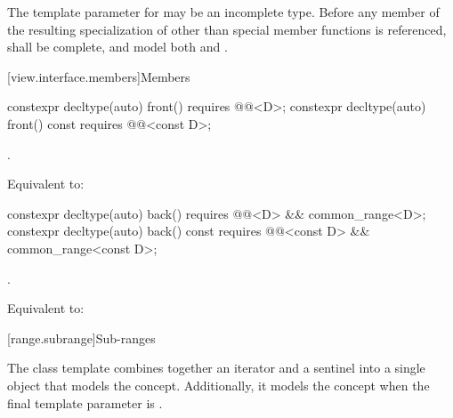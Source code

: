 \pnum
The template parameter  for  may be an
incomplete type. Before any member of the resulting specialization of
 other than special member functions
is referenced,  shall be complete, and
model both  and .

[view.interface.members]{Members}

%
\begin{itemdecl}
constexpr decltype(auto) front() requires @@<D>;
constexpr decltype(auto) front() const requires @@<const D>;
\end{itemdecl}

\begin{itemdescr}
\pnum
\expects
{}.

\pnum
\effects
Equivalent to: 
\end{itemdescr}

%
\begin{itemdecl}
constexpr decltype(auto) back() requires @@<D> && common_range<D>;
constexpr decltype(auto) back() const
  requires @@<const D> && common_range<const D>;
\end{itemdecl}

\begin{itemdescr}
\pnum
\expects
{}.

\pnum
\effects
Equivalent to: 
\end{itemdescr}

[range.subrange]{Sub-ranges}

\pnum
The  class template combines together an
iterator and a sentinel into a single object that models the
 concept. Additionally, it models the
 concept when the final template parameter is
.

